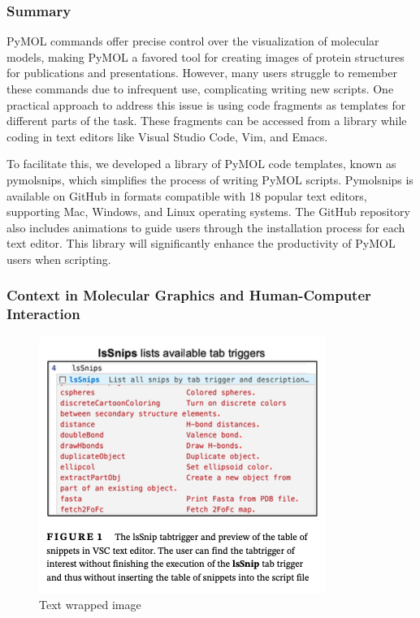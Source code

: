 
\subsubsection*{Summary}
PyMOL commands offer precise control over the visualization of molecular models, making PyMOL a favored tool for creating images of protein structures for publications and presentations. However, many users struggle to remember these commands due to infrequent use, complicating writing new scripts. 
One practical approach to address this issue is using code fragments as templates for different parts of the task. 
These fragments can be accessed from a library while coding in text editors like Visual Studio Code, Vim, and Emacs.


To facilitate this, we developed a library of PyMOL code templates, known as pymolsnips, which simplifies the process of writing PyMOL scripts. 
Pymolsnips is available on GitHub in formats compatible with 18 popular text editors, supporting Mac, Windows, and Linux operating systems. 
The GitHub repository also includes animations to guide users through the installation process for each text editor. 
This library will significantly enhance the productivity of PyMOL users when scripting.


\subsubsection*{Context in Molecular Graphics and Human-Computer Interaction}
\begin{figure} %
\vspace{-10pt}
\includegraphics[scale=0.4]{imagesBlaine/Mooers2021TemplatesFig1.png}
\caption{\footnotesize Text wrapped image }
\vspace{-10pt}
\label{fig:preview}
\end{figure}

